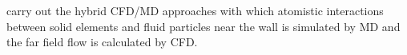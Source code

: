 \documentclass[conference,final]{IEEEtran}
\begin{document}


carry out the hybrid CFD/MD approaches with which atomistic
interactions between solid elements and fluid particles near the wall
is simulated by MD and the far field flow is calculated by CFD.
\end{document}
